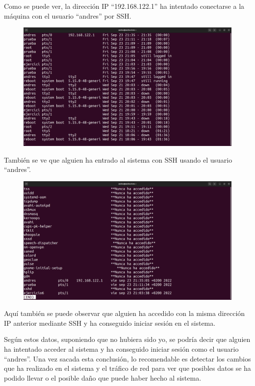 \documentclass{article}
\begin{document}
Como se puede ver, la dirección IP ``192.168.122.1'' ha intentado conectarse a la máquina con el usuario ``andres'' por SSH. 

\begin{figure}[H]
    \includegraphics[width=\textwidth]{imagenes/lastip.png}
\end{figure}

También se ve que alguien ha entrado al sistema con SSH usando el usuario ``andres''.

\begin{figure}[H]
    \includegraphics[width=\textwidth]{imagenes/lastlogip.png}
\end{figure}

Aquí también se puede observar que alguien ha accedido con la misma dirección IP anterior mediante SSH y ha conseguido iniciar sesión en el sistema.

\bigskip

Según estos datos, suponiendo que no hubiera sido yo, se podría decir que alguien ha intentado acceder al sistema y ha conseguido iniciar sesión como el usuario ``andres''. Una vez sacada esta conclusión, lo recomendable es detectar los cambios que ha realizado en el sistema y el tráfico de red para ver que posibles datos se ha podido llevar o el posible daño que puede haber hecho al sistema.
\end{document}
